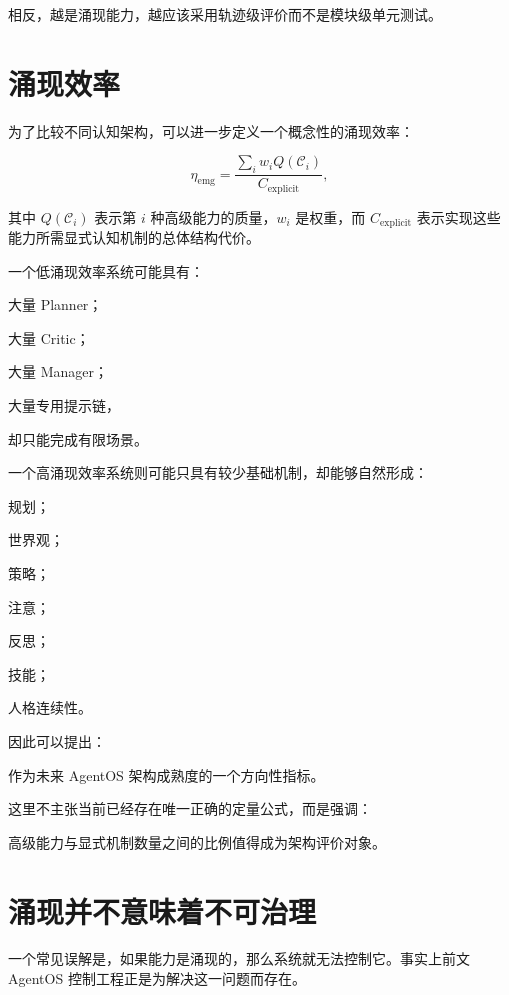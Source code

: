 相反，越是涌现能力，越应该采用轨迹级评价而不是模块级单元测试。

\section{涌现效率}

为了比较不同认知架构，可以进一步定义一个概念性的涌现效率：

\[
\boxed{
\eta_{\mathrm{emg}}
=
\frac{
\sum_i
w_iQ(\mathcal C_i)
}{
C_{\mathrm{explicit}}
},
}
\]

其中 $Q(\mathcal C_i)$ 表示第 $i$ 种高级能力的质量，$w_i$ 是权重，而 $C_{\mathrm{explicit}}$ 表示实现这些能力所需显式认知机制的总体结构代价。

一个低涌现效率系统可能具有：

大量 Planner；

大量 Critic；

大量 Manager；

大量专用提示链，

却只能完成有限场景。

一个高涌现效率系统则可能只具有较少基础机制，却能够自然形成：

规划；

世界观；

策略；

注意；

反思；

技能；

人格连续性。

因此可以提出：

\begin{statementbox}
\centering
{}
\end{statementbox}

作为未来 AgentOS 架构成熟度的一个方向性指标。

这里不主张当前已经存在唯一正确的定量公式，而是强调：

\begin{statementbox}
高级能力与显式机制数量之间的比例值得成为架构评价对象。
\end{statementbox}

\section{涌现并不意味着不可治理}

一个常见误解是，如果能力是涌现的，那么系统就无法控制它。事实上前文 AgentOS 控制工程正是为解决这一问题而存在。

